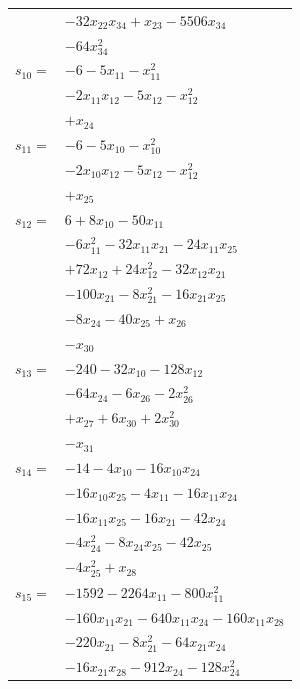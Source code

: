 \begin{longtable}{@{}r@{\;}l@{}}
 & \(\displaystyle -32x_{22}x_{34} +x_{23} -5506x_{34}\) \\
 & \(\displaystyle -64x_{34}^{2}\) \\[3pt]
\(s_{10}=\) & \(\displaystyle -6 -5x_{11} -x_{11}^{2}\) \\
 & \(\displaystyle -2x_{11}x_{12} -5x_{12} -x_{12}^{2}\) \\
 & \(\displaystyle +x_{24}\) \\[3pt]
\(s_{11}=\) & \(\displaystyle -6 -5x_{10} -x_{10}^{2}\) \\
 & \(\displaystyle -2x_{10}x_{12} -5x_{12} -x_{12}^{2}\) \\
 & \(\displaystyle +x_{25}\) \\[3pt]
\(s_{12}=\) & \(\displaystyle 6 +8x_{10} -50x_{11}\) \\
 & \(\displaystyle -6x_{11}^{2} -32x_{11}x_{21} -24x_{11}x_{25}\) \\
 & \(\displaystyle +72x_{12} +24x_{12}^{2} -32x_{12}x_{21}\) \\
 & \(\displaystyle -100x_{21} -8x_{21}^{2} -16x_{21}x_{25}\) \\
 & \(\displaystyle -8x_{24} -40x_{25} +x_{26}\) \\
 & \(\displaystyle -x_{30}\) \\[3pt]
\(s_{13}=\) & \(\displaystyle -240 -32x_{10} -128x_{12}\) \\
 & \(\displaystyle -64x_{24} -6x_{26} -2x_{26}^{2}\) \\
 & \(\displaystyle +x_{27} +6x_{30} +2x_{30}^{2}\) \\
 & \(\displaystyle -x_{31}\) \\[3pt]
\(s_{14}=\) & \(\displaystyle -14 -4x_{10} -16x_{10}x_{24}\) \\
 & \(\displaystyle -16x_{10}x_{25} -4x_{11} -16x_{11}x_{24}\) \\
 & \(\displaystyle -16x_{11}x_{25} -16x_{21} -42x_{24}\) \\
 & \(\displaystyle -4x_{24}^{2} -8x_{24}x_{25} -42x_{25}\) \\
 & \(\displaystyle -4x_{25}^{2} +x_{28}\) \\[3pt]
\(s_{15}=\) & \(\displaystyle -1592 -2264x_{11} -800x_{11}^{2}\) \\
 & \(\displaystyle -160x_{11}x_{21} -640x_{11}x_{24} -160x_{11}x_{28}\) \\
 & \(\displaystyle -220x_{21} -8x_{21}^{2} -64x_{21}x_{24}\) \\
 & \(\displaystyle -16x_{21}x_{28} -912x_{24} -128x_{24}^{2}\) \\

\end{longtable}
